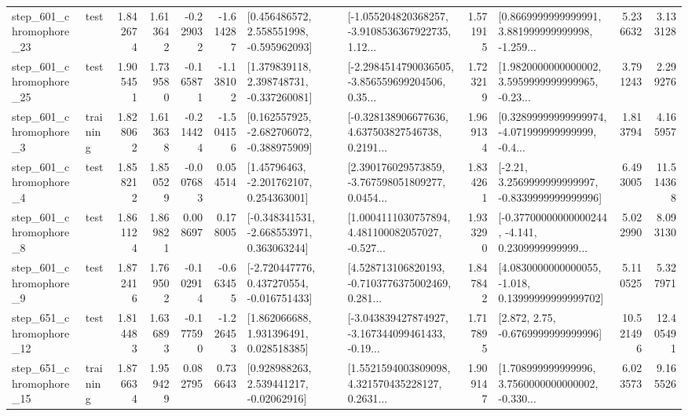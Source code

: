 \begin{tabular}{llrrrrllrlrr}
  step\_601\_chromophore\_23 &      test &      1.842674 &    1.613642 &     -0.229032 & -1.614287 &    [0.456486572, 2.558551998, -0.595962093] &  [-1.055204820368257, -3.9108536367922735, 1.12... &       1.571915 &  [0.8669999999999991, 3.881999999999998, -1.259... &            5.236632 &          3.133128 \\
  step\_601\_chromophore\_25 &      test &      1.905451 &    1.739580 &     -0.165871 & -1.138102 &    [1.379839118, 2.398748731, -0.337260081] &  [-2.2984514790036505, -3.856559699204506, 0.35... &       1.723219 &  [1.9820000000000002, 3.5959999999999965, -0.23... &            3.791243 &          2.299276 \\
   step\_601\_chromophore\_3 &  training &      1.828062 &    1.613638 &     -0.214424 & -1.504156 &   [0.162557925, -2.682706072, -0.388975909] &  [-0.328138906677636, 4.637503827546738, 0.2191... &       1.969134 &  [0.32899999999999974, -4.071999999999999, -0.4... &            1.813794 &          4.165957 \\
   step\_601\_chromophore\_4 &      test &      1.858212 &    1.850529 &     -0.007683 &  0.054514 &     [1.45796463, -2.201762107, 0.254363001] &  [2.390176029573859, -3.767598051809277, 0.0454... &       1.834261 &   [-2.21, 3.2569999999999997, -0.8339999999999996] &            6.493005 &         11.514368 \\
   step\_601\_chromophore\_8 &      test &      1.861124 &    1.869821 &      0.008697 &  0.178005 &   [-0.348341531, -2.668553971, 0.363063244] &  [1.0004111030757894, 4.481100082057027, -0.527... &       1.933290 &  [-0.37700000000000244, -4.141, 0.2309999999999... &            5.022990 &          8.093130 \\
   step\_601\_chromophore\_9 &      test &      1.872416 &    1.769502 &     -0.102914 & -0.663455 &   [-2.720447776, 0.437270554, -0.016751433] &  [4.528713106820193, -0.7103776375002469, 0.281... &       1.847842 &  [4.0830000000000055, -1.018, 0.13999999999999702] &            5.110525 &          5.327971 \\
  step\_651\_chromophore\_12 &      test &      1.814483 &    1.636893 &     -0.177590 & -1.226453 &     [1.862066688, 1.931396491, 0.028518385] &  [-3.043839427874927, -3.167344099461433, -0.19... &       1.717895 &                 [2.872, 2.75, -0.6769999999999996] &           10.521496 &         12.405491 \\
  step\_651\_chromophore\_15 &  training &      1.876634 &    1.959429 &      0.082795 &  0.736643 &     [0.928988263, 2.539441217, -0.02062916] &  [1.5521594003809098, 4.321570435228127, 0.2631... &       1.909147 &  [1.708999999999996, 3.7560000000000002, -0.330... &            6.023573 &          9.165526 \\

\end{tabular}
